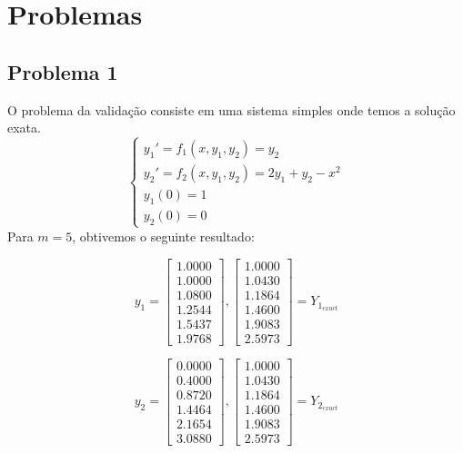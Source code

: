 \section*{Problemas}
\subsection*{Problema 1}
O problema da validação consiste em uma sistema simples onde temos a solução exata.
$$
\left\{
    \begin{array}{l}
        y_1' = f_1(x, y_1, y_2) = y_2 \\
        y_2' = f_2(x, y_1, y_2) = 2y_1 + y_2 - x^2 \\
        y_1(0) = 1 \\
        y_2(0) = 0
    \end{array}
\right.
$$
Para $m = 5$, obtivemos o seguinte resultado:

$$ 
y_1 = \begin{bmatrix}
    1.0000 \\
    1.0000 \\
    1.0800 \\
    1.2544 \\
    1.5437 \\
    1.9768
\end{bmatrix}, \begin{bmatrix}
    1.0000 \\
    1.0430 \\
    1.1864 \\
    1.4600 \\
    1.9083 \\
    2.5973
\end{bmatrix} = Y_{1_{exact}} 
$$

$$
y_2 = \begin{bmatrix}
    0.0000 \\
    0.4000 \\
    0.8720 \\
    1.4464 \\
    2.1654 \\
    3.0880
\end{bmatrix}, \begin{bmatrix}
    1.0000 \\
    1.0430 \\
    1.1864 \\
    1.4600 \\
    1.9083 \\
    2.5973
\end{bmatrix} = Y_{2_{exact}} 
$$

